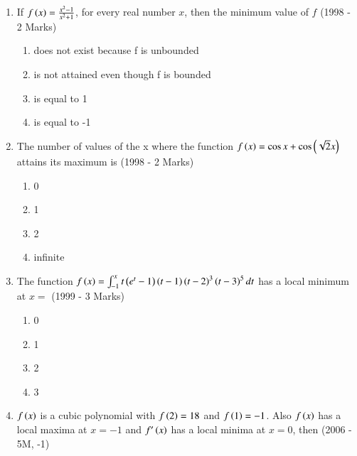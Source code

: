 \documentclass[journal,12pt,twocolumn]{IEEEtran}
\theoremstyle{remark}
\begin{document}
    \begin{enumerate}
    \item{
            If $f\left(x\right) =  \frac{x^2-1}{x^2+1}$, for every real number $x$, then the minimum value of $f$  \hfill
                {(1998 - 2 Marks)}
            \begin{enumerate}
                \item does not exist because f is unbounded
                \item is not attained even though f is bounded
                \item is equal to 1
                \item is equal to -1
            \end{enumerate} }
    \item{
            The number of values of the x where the function $f\left(x\right)=\cos x + \cos\left(\sqrt{2}x\right)$ attains its maximum is  \hfill
                {(1998 - 2 Marks)}
            \begin{multicols}{2}
                \begin{enumerate}
                    \item 0
                    \item 1
                    \item 2
                    \item infinite
                \end{enumerate}
            \end{multicols}
        }
    \item{
     
            The function $f\left(x\right)= \int_{-1}^x t\left(e^t-1\right)\left(t-1\right)\left(t-2\right)^3\left(t-3\right)^5dt$ has a local minimum at $x=$  \hfill
                {(1999 - 3 Marks)}
            \begin{multicols}{2}
                \begin{enumerate}
                    \item 0 
                    \item 1
                    \item 2
                    \item 3
                \end{enumerate}
            \end{multicols}
        
        }
    \item{
        
            $f\left(x\right)$ is a cubic polynomial with  $f\left(2\right)=18$ and $f\left(1\right)=-1$. Also $f\left(x\right)$ has a local maxima at $x=-1$ and $f'\left(x\right)$ has a local minima at $x=0$, then
              \hfill
                {(2006 - 5M, -1)}
            
}
\end{enumerate}
\end{document}
